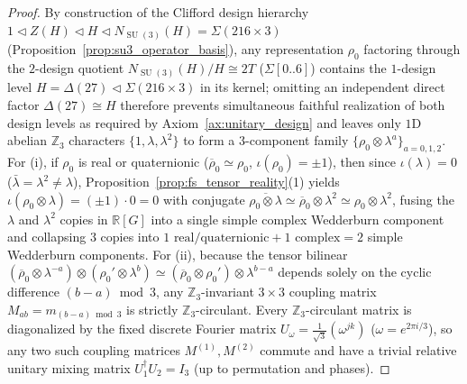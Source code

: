 \documentclass[11pt,a4paper]{article}
\theoremstyle{definition}
\theoremstyle{remark}
\newcommand{\R}{\mathbb{R}}
\newcommand{\Z}{\mathbb{Z}}
\newcommand{\SU}{\operatorname{SU}}
\begin{document}
\begin{proof}
By construction of the Clifford design hierarchy $1 \triangleleft Z(H) \triangleleft H \triangleleft N_{\SU(3)}(H) = \Sigma(216 \times 3)$ (Proposition~\ref{prop:su3_operator_basis}), any representation $\rho_0$ factoring through the $2$-design quotient $N_{\SU(3)}(H)/H \cong 2T$ ($\Sigma[0..6]$) contains the $1$-design level $H = \Delta(27) \triangleleft \Sigma(216 \times 3)$ in its kernel; omitting an independent direct factor $\Delta(27) \cong H$ therefore prevents simultaneous faithful realization of both design levels as required by Axiom~\ref{ax:unitary_design} and leaves only $1$D abelian $\Z_3$ characters $\{1, \lambda, \lambda^2\}$ to form a $3$-component family $\{\rho_0 \otimes \lambda^a\}_{a=0,1,2}$. For (i), if $\rho_0$ is real or quaternionic ($\overline{\rho}_0 \simeq \rho_0$, $\iota(\rho_0) = \pm 1$), then since $\iota(\lambda) = 0$ ($\bar{\lambda} = \lambda^2 \neq \lambda$), Proposition~\ref{prop:fs_tensor_reality}(1) yields $\iota(\rho_0 \otimes \lambda) = (\pm 1)\cdot 0 = 0$ with conjugate $\overline{\rho_0 \otimes \lambda} \simeq \overline{\rho}_0 \otimes \lambda^2 \simeq \rho_0 \otimes \lambda^2$, fusing the $\lambda$ and $\lambda^2$ copies in $\R[G]$ into a single simple complex Wedderburn component and collapsing $3$ copies into $1\text{ real/quaternionic} + 1\text{ complex} = 2$ simple Wedderburn components. For (ii), because the tensor bilinear $(\overline{\rho}_0 \otimes \lambda^{-a}) \otimes (\rho_0' \otimes \lambda^{b}) \simeq (\overline{\rho}_0 \otimes \rho_0') \otimes \lambda^{b-a}$ depends solely on the cyclic difference $(b - a) \bmod 3$, any $\Z_3$-invariant $3 \times 3$ coupling matrix $M_{ab} = m_{(b-a)\bmod 3}$ is strictly $\Z_3$-circulant. Every $\Z_3$-circulant matrix is diagonalized by the fixed discrete Fourier matrix $U_\omega = \frac{1}{\sqrt{3}}(\omega^{jk})$ ($\omega = e^{2\pi i/3}$), so any two such coupling matrices $M^{(1)}, M^{(2)}$ commute and have a trivial relative unitary mixing matrix $U_1^\dagger U_2 = I_3$ (up to permutation and phases).
\end{proof}
\end{document}
